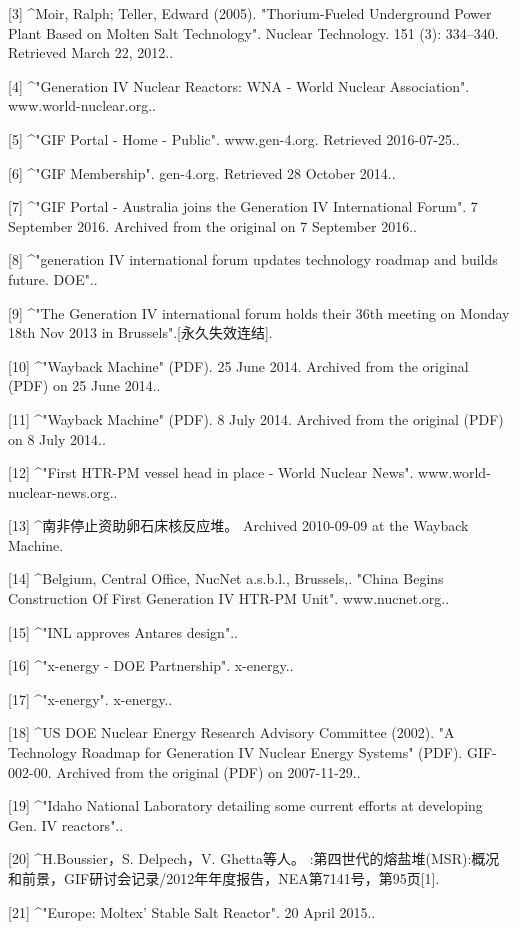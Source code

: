 [3]
^Moir, Ralph; Teller, Edward (2005). "Thorium-Fueled Underground Power Plant Based on Molten Salt Technology". Nuclear Technology. 151 (3): 334–340. Retrieved March 22, 2012..

[4]
^"Generation IV Nuclear Reactors: WNA - World Nuclear Association". www.world-nuclear.org..

[5]
^"GIF Portal - Home - Public". www.gen-4.org. Retrieved 2016-07-25..

[6]
^"GIF Membership". gen-4.org. Retrieved 28 October 2014..

[7]
^"GIF Portal - Australia joins the Generation IV International Forum". 7 September 2016. Archived from the original on 7 September 2016..

[8]
^"generation IV international forum updates technology roadmap and builds future. DOE"..

[9]
^"The Generation IV international forum holds their 36th meeting on Monday 18th Nov 2013 in Brussels".[永久失效连结].

[10]
^"Wayback Machine" (PDF). 25 June 2014. Archived from the original (PDF) on 25 June 2014..

[11]
^"Wayback Machine" (PDF). 8 July 2014. Archived from the original (PDF) on 8 July 2014..

[12]
^"First HTR-PM vessel head in place - World Nuclear News". www.world-nuclear-news.org..

[13]
^南非停止资助卵石床核反应堆。 Archived 2010-09-09 at the Wayback Machine.

[14]
^Belgium, Central Office, NucNet a.s.b.l., Brussels,. "China Begins Construction Of First Generation IV HTR-PM Unit". www.nucnet.org..

[15]
^"INL approves Antares design"..

[16]
^"x-energy - DOE Partnership". x-energy..

[17]
^"x-energy". x-energy..

[18]
^US DOE Nuclear Energy Research Advisory Committee (2002). "A Technology Roadmap for Generation IV Nuclear Energy Systems" (PDF). GIF-002-00. Archived from the original (PDF) on 2007-11-29..

[19]
^"Idaho National Laboratory detailing some current efforts at developing Gen. IV reactors"..

[20]
^H.Boussier，S. Delpech，V. Ghetta等人。 :第四世代的熔盐堆(MSR):概况和前景，GIF研讨会记录/2012年年度报告，NEA第7141号，第95页[1].

[21]
^"Europe: Moltex' Stable Salt Reactor". 20 April 2015..

